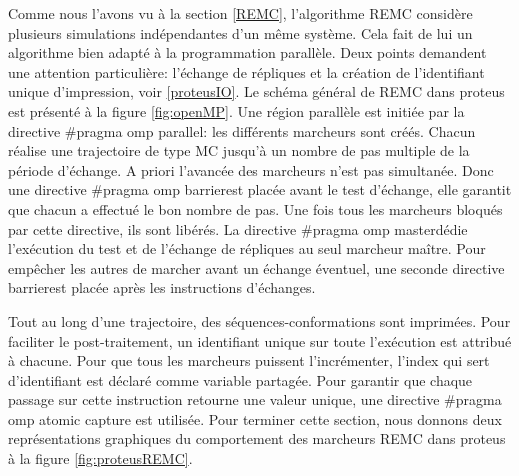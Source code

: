 Comme nous l'avons vu à la section \ref{REMC}, l'algorithme REMC considère plusieurs simulations indépendantes d'un même système. Cela fait de lui un algorithme bien adapté à la programmation parallèle. Deux points demandent une attention particulière: l'échange de répliques et la création de l'identifiant unique d'impression, voir \ref{proteusIO}. Le schéma général de REMC dans proteus est présenté à la figure \ref{fig:openMP}. Une région parallèle est initiée par la directive \og \#pragma omp parallel\fg: les différents marcheurs sont créés. Chacun réalise une trajectoire de type MC jusqu'à un nombre de pas multiple de la période d'échange. A priori l'avancée des marcheurs n'est pas simultanée. Donc une directive \og \#pragma omp barrier\fg est placée avant le test d'échange, elle garantit que chacun a effectué le bon nombre de pas. Une fois tous les marcheurs bloqués par cette directive, ils sont libérés. La directive \og \#pragma omp master\fg dédie l'exécution du test et de l'échange de répliques au seul marcheur maître. Pour empêcher les autres de marcher avant un échange éventuel, une seconde directive \og barrier\fg est placée après les instructions d'échanges.

Tout au long d'une trajectoire, des séquences-conformations sont imprimées. Pour faciliter le post-traitement, un identifiant unique sur toute l'exécution est attribué à chacune. Pour que tous les marcheurs puissent l'incrémenter, l'index qui sert d'identifiant est déclaré comme variable partagée. Pour garantir que chaque passage sur cette instruction retourne une valeur unique, une directive \og \#pragma omp atomic capture \fg est utilisée. Pour terminer cette section, nous donnons deux représentations graphiques du comportement des marcheurs REMC dans proteus à la figure \ref{fig:proteusREMC}.  

